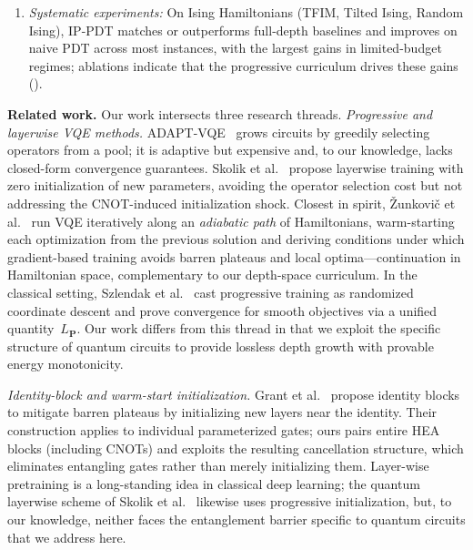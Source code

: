 \documentclass[11pt]{article}
\theoremstyle{plain}
\theoremstyle{plain}
\begin{document}
\begin{enumerate}[leftmargin=*,itemsep=2pt]
    of gate counts, per-step costs, and cumulative training costs for
    the baseline, na\"ive PDT, and IP-PDT, showing that IP-PDT achieves
    the lowest total gate cost ().\vspace{-0.1cm}
  \item \textit{Systematic experiments:} On Ising
    Hamiltonians (TFIM, Tilted Ising, Random Ising), IP-PDT matches or
    outperforms full-depth baselines and improves on naive PDT across
    most instances, with the largest gains in limited-budget regimes;
    ablations indicate that the progressive curriculum drives these gains
    ().\vspace{-0.1cm}
\end{enumerate}

\medskip\noindent\textbf{Related work.}
Our work intersects three research threads.
\textit{Progressive and layerwise VQE methods.}
ADAPT-VQE~\cite{grimsley2019adaptive} grows circuits by greedily
selecting operators from a pool; it is adaptive but expensive and, to our knowledge,
lacks closed-form convergence guarantees.
Skolik et al.~\cite{skolik2021layerwise} propose layerwise training
with zero initialization of new parameters, avoiding the operator
selection cost but not addressing the CNOT-induced initialization
shock.
Closest in spirit, \v{Z}unkovi\v{c} et al.~\cite{zunkovic2026adiabatic}
run VQE iteratively along an \emph{adiabatic path} of Hamiltonians,
warm-starting each optimization from the previous solution and deriving
conditions under which gradient-based training avoids barren plateaus and
local optima---continuation in Hamiltonian space, complementary to our
depth-space curriculum.
In the classical setting, Szlendak et al.~\cite{szlendak2024rpt}
cast progressive training as randomized coordinate descent and prove
convergence for smooth objectives via a unified quantity~$L_\mathbf{P}$.
Our work differs from this thread in that we exploit the specific
structure of quantum circuits to provide lossless depth growth
with provable energy monotonicity.

\textit{Identity-block and warm-start initialization.}
Grant et al.~\cite{grant2019initialization} propose identity blocks
to mitigate barren plateaus by initializing new layers near the
identity.  Their construction applies to individual parameterized
gates; ours pairs entire HEA blocks (including CNOTs) and
exploits the resulting cancellation structure, which eliminates
entangling gates rather than merely initializing them.
Layer-wise pretraining is a long-standing idea in classical deep
learning; the quantum layerwise scheme of Skolik et
al.~\cite{skolik2021layerwise} likewise uses progressive
initialization, but, to our knowledge, neither faces the entanglement barrier specific
to quantum circuits that we address here.
\end{document}
